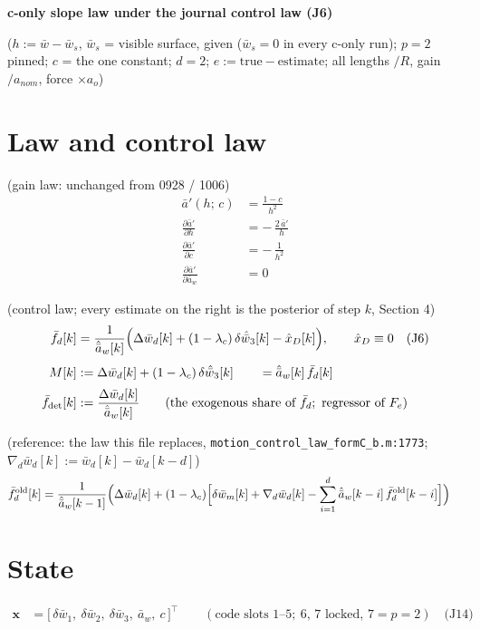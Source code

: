 \documentclass[11pt,a4paper,fontset=none]{ctexart}
\newcommand{\ba}{\bar{a}}
\newcommand{\bw}{\bar{w}}
\newcommand{\dW}{\Delta\bw}
\newcommand{\ap}{\ba'}
\newcommand{\ah}{\hat{\ba}_w}
\newcommand{\lc}{\lambda_c}
\newcommand{\fd}{\bar{f}_d}
\newcommand{\fdet}{\bar{f}_{\det}}
\newcommand{\J}[1]{\quad\text{(J#1)}}
\begin{document}
\begin{center}\textbf{\large c-only slope law under the journal control law (J6)}\end{center}

($h := \bw - \bw_s$, $\bw_s$ = visible surface, given ($\bw_s = 0$ in every c-only run); $p = 2$ pinned; $c$ = the one constant;
$d = 2$; $e := \text{true} - \text{estimate}$; all lengths $/R$, gain $/a_{nom}$, force $\times a_o$)

\section{Law and control law}

(gain law: unchanged from 0928 / 1006)
\begin{align*}
\ap(h;\,c)                        &= \frac{1 - c}{h^{2}} \\[2pt]
\frac{\partial\ap}{\partial h}    &= -\,\frac{2\,\ap}{h} \\[2pt]
\frac{\partial\ap}{\partial c}    &= -\,\frac{1}{h^{2}} \\[2pt]
\frac{\partial\ap}{\partial\ba_w} &= 0
\end{align*}

(control law; every estimate on the right is the posterior of step $k$, Section 4)
\begin{align*}
\fd[k]    &= \frac{1}{\ah[k]}\Bigl(\dW_d[k] + (1-\lc)\,\delta\hat{\bw}_3[k] - \hat{x}_D[k]\Bigr), \qquad \hat{x}_D \equiv 0 \J{6} \\[4pt]
M[k]      &:= \dW_d[k] + (1-\lc)\,\delta\hat{\bw}_3[k] \qquad = \ah[k]\,\fd[k] \\[2pt]
\fdet[k]  &:= \frac{\dW_d[k]}{\ah[k]} \qquad(\text{the exogenous share of } \fd;\ \text{regressor of } F_e)
\end{align*}

(reference: the law this file replaces, \texttt{motion\_control\_law\_formC\_b.m:1773}; $\nabla_d\bw_d[k] := \bw_d[k] - \bw_d[k-d]$)
\begin{align*}
\fd^{\mathrm{old}}[k] &= \frac{1}{\ah[k-1]}\Bigl(\dW_d[k] + (1-\lc)\Bigl[\delta\bw_m[k] + \nabla_d\bw_d[k] - \sum_{i=1}^{d}\ah[k-i]\,\fd^{\mathrm{old}}[k-i]\Bigr]\Bigr)
\end{align*}

\section{State}

\begin{align*}
\mathbf{x} &= \bigl[\,\delta\bw_1,\ \delta\bw_2,\ \delta\bw_3,\ \ba_w,\ c\,\bigr]^{\top}
\qquad(\text{code slots } 1\text{--}5;\ 6,\,7 \text{ locked, } 7 = p = 2) \J{14}
\end{align*}
\end{document}
